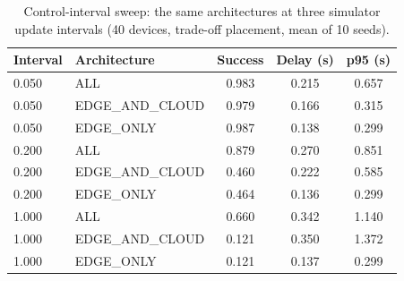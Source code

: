 \begin{table}
\centering
\footnotesize
\caption{Control-interval sweep: the same architectures at three simulator update intervals (40 devices, trade-off placement, mean of 10 seeds).}
\label{tab:p1-clock}
\begin{tabular}{llccc}
\toprule
Interval & Architecture & Success & Delay (s) & p95 (s) \\
\midrule
0.050 & ALL & 0.983 & 0.215 & 0.657 \\
0.050 & EDGE\_AND\_CLOUD & 0.979 & 0.166 & 0.315 \\
0.050 & EDGE\_ONLY & 0.987 & 0.138 & 0.299 \\
0.200 & ALL & 0.879 & 0.270 & 0.851 \\
0.200 & EDGE\_AND\_CLOUD & 0.460 & 0.222 & 0.585 \\
0.200 & EDGE\_ONLY & 0.464 & 0.136 & 0.299 \\
1.000 & ALL & 0.660 & 0.342 & 1.140 \\
1.000 & EDGE\_AND\_CLOUD & 0.121 & 0.350 & 1.372 \\
1.000 & EDGE\_ONLY & 0.121 & 0.137 & 0.299 \\
\bottomrule
\end{tabular}
\par\vspace{2pt}{\footnotesize\raggedright At 1 s every infrastructure hand-off costs a full tick, which is longer than the 0.2 s and 0.8 s deadlines. At 50 ms the architecture effect disappears.\par}
\end{table}

